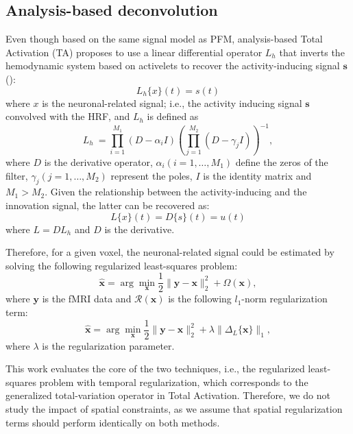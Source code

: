 
\subsection{Analysis-based deconvolution}

Even though based on the same signal model as PFM, analysis-based Total Activation (TA) proposes to use a linear differential operator \(L_h\) that inverts the hemodynamic system based on activelets to recover the activity-inducing signal \(\mathbf{s}\) (\citealt{karahanoglu2013TotalActivationFMRI,khalidov2011activelets,karahanoglu2011SignalProcessingApproacha}):
\begin{equation}
    L_h\{x\}(t) = s(t)
\end{equation}
where \(x\) is the neuronal-related signal; i.e., the activity inducing signal \(\mathbf{s}\) convolved with the HRF, and \(L_h\) is defined as
\begin{equation}
    L_h\ = \prod_{i=1}^{M_1} (D-\alpha_i I) (\prod_{j=1}^{M_2} (D - \gamma_j I))^{-1},
\end{equation}
where \(D\) is the derivative operator, \(\alpha_i (i=1, \hdots, M_1)\) define the zeros of the filter, \(\gamma_j (j=1, \hdots, M_2)\) represent the poles, \(I\) is the identity matrix and \(M_1 > M_2\). Given the relationship between the activity-inducing and the innovation signal, the latter can be recovered as:
\begin{equation}
    L\{x\}(t) = D\{s\}(t) = u(t)
\end{equation}
where \(L = DL_h\) and \(D\) is the derivative.

Therefore, for a given voxel, the neuronal-related signal could be estimated by solving the following regularized least-squares problem:
\begin{equation}
    \hat{\mathbf{x}} = \arg \min_{\mathbf{x}} \frac{1}{2} \| \mathbf{y} - \mathbf{x} \|_2^2 + \Omega(\mathbf{x}),
\end{equation}
where \(\mathbf{y}\) is the fMRI data and \(\mathcal{R}(\mathbf{x})\) is the following \(l_1\)-norm regularization term:
\begin{equation}
    \hat{\mathbf{x}} = \arg \min_{\mathbf{x}} \frac{1}{2} \| \mathbf{y} - \mathbf{x} \|_2^2 + \lambda \| \Delta_L \{\mathbf{x}\} \|_1,
\end{equation}
where \(\lambda\) is the regularization parameter.

This work evaluates the core of the two techniques, i.e., the regularized least-squares problem with temporal regularization, which corresponds to the generalized total-variation operator in Total Activation. Therefore, we do not study the impact of spatial constraints, as we assume that spatial regularization terms should perform identically on both methods.